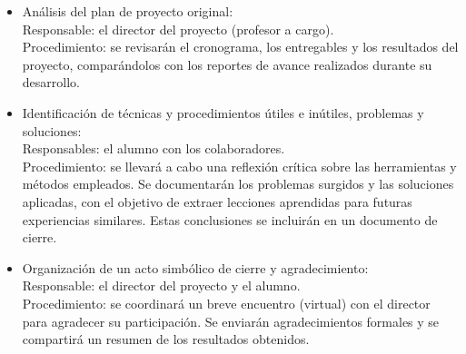 \documentclass[
11pt, %
]{charter}
\begin{document}
\begin{itemize}
    \item Análisis del plan de proyecto original: \\
     Responsable: el director del proyecto (profesor a cargo). \\
     Procedimiento: se revisarán el cronograma, los entregables y los resultados del proyecto, comparándolos con los reportes de avance realizados durante su desarrollo.

    \item Identificación de técnicas y procedimientos útiles e inútiles, problemas y soluciones: \\
     Responsables: el alumno con los  colaboradores. \\
     Procedimiento: se llevará a cabo una reflexión crítica sobre las herramientas y métodos empleados. Se documentarán los problemas surgidos y las soluciones aplicadas, con el objetivo de extraer lecciones aprendidas para futuras experiencias similares. Estas conclusiones se incluirán en un documento de cierre.

    \item Organización de un acto simbólico de cierre y agradecimiento: \\
    Responsable: el director del proyecto y el alumno. \\
    Procedimiento: se coordinará un breve encuentro (virtual) con el director para agradecer su participación. Se enviarán agradecimientos formales y se compartirá un resumen de los resultados obtenidos.
\end{itemize}
\end{document}
